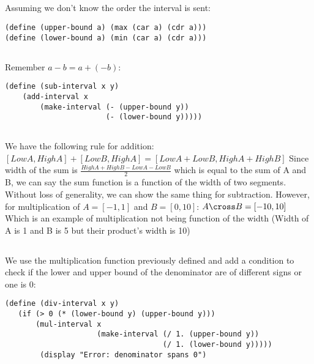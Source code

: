 \documentclass{article}
\begin{document}
\subsection{}
Assuming we don't know the order the interval is sent:
\begin{verbatim}
(define (upper-bound a) (max (car a) (cdr a))) 
(define (lower-bound a) (min (car a) (cdr a))) 
\end{verbatim}
\subsection{}
Remember $a-b=a+(-b)$:
\begin{verbatim}
(define (sub-interval x y)
    (add-interval x 
        (make-interval (- (upper-bound y)) 
                       (- (lower-bound y))))) 
\end{verbatim}

\subsection{}
We have the following rule for addition: \newline 
$[LowA, HighA] + [LowB, HighA] = [LowA + LowB, HighA + HighB]$ \newline
Since width of the sum is $\frac{HighA + HighB - LowA - LowB}{2}$ which is equal to the sum of A and B, we can say the sum function is a function of the width of two segments. Without loss of generality, we can show the same thing for subtraction.\newline
However, for multiplication of $A=[-1,1]$ and $B=[0,10]$:\newline
$A \cross B = [-10, 10]$
Which is an example of multiplication not being function of the width (Width of A is 1 and B is 5 but their product's width is 10)

\subsection{}
We use the multiplication function previously defined and add a condition to check if the lower and upper bound of the denominator are of different signs or one is 0:
\begin{verbatim}
(define (div-interval x y) 
   (if (> 0 (* (lower-bound y) (upper-bound y))) 
       (mul-interval x  
                     (make-interval (/ 1. (upper-bound y)) 
                                    (/ 1. (lower-bound y)))))
        (display "Error: denominator spans 0") 
\end{verbatim}
\end{document}
